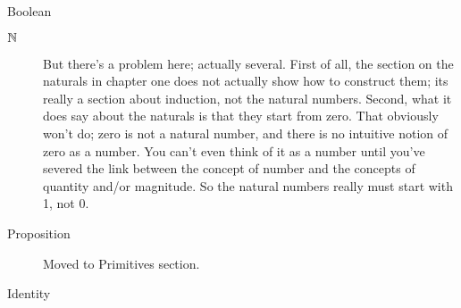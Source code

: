\begin{description}
\item [Boolean] \citep[p. 34]{hottbook}
\item [$\mathbb{N}$] \citep[p. 36]{hottbook} But there's a problem here;
  actually several.  First of all, the section on the naturals in
  chapter one does not actually show how to construct them; its really
  a section about induction, not the natural numbers.  Second, what it
  does say about the naturals is that they start from zero.  That
  obviously won't do; zero is not a natural number, and there is no
  intuitive notion of zero as a number.  You can't even think of it as
  a number until you've severed the link between the concept of number
  and the concepts of quantity and/or magnitude.  So the natural
  numbers really must start with 1, not 0.
\item [Proposition]  Moved to Primitives section.
\item [Identity]
\end{description}

